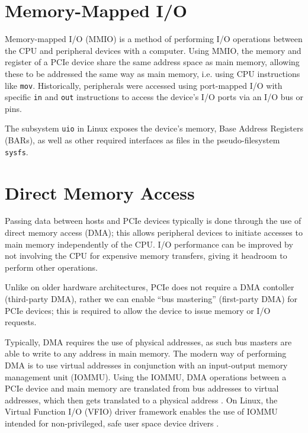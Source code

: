 

\section{Memory-Mapped I/O}
Memory-mapped I/O (MMIO) is a method of performing I/O operations between the CPU and peripheral devices with a computer. Using MMIO, the memory and register of a PCIe device share the same address space as main memory, allowing these to be addressed the same way as main memory, i.e. using CPU instructions like \texttt{mov}. Historically, peripherals were accessed using port-mapped I/O with specific \texttt{in} and \texttt{out} instructions to access the device's I/O ports via an I/O bus or pins.

The subsystem \texttt{uio} in Linux exposes the device's memory, Base Address Registers (BARs), as well as other required interfaces as files in the pseudo-filesystem \texttt{sysfs}.

\section{Direct Memory Access}
Passing data between hosts and PCIe devices typically is done through the use of direct memory access (DMA); this allows peripheral devices to initiate accesses to main memory independently of the CPU. I/O performance can be improved by not involving the CPU for expensive memory transfers, giving it headroom to perform other operations.

Unlike on older hardware architectures, PCIe does not require a DMA contoller (third-party DMA), rather we can enable ``bus mastering'' (first-party DMA) for PCIe devices; this is required to allow the device to issue memory or I/O requests.

Typically, DMA requires the use of physical addresses, as such bus masters are able to write to any address in main memory. The modern way of performing DMA is to use virtual addresses in conjunction with an input-output memory management unit (IOMMU). Using the IOMMU, DMA operations between a PCIe device and main memory are translated from bus addresses to virtual addresses, which then gets translated to a physical address \cite{spdk-dma}. On Linux, the Virtual Function I/O (VFIO) driver framework enables the use of IOMMU intended for non-privileged, safe user space device drivers \cite{vfio}.


